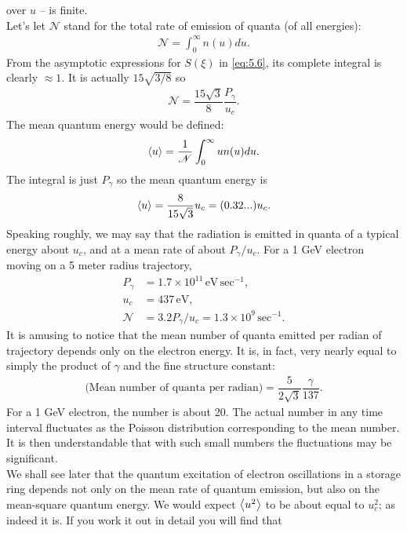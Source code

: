  over $u$ -- is finite.\\
Let's let $\mathscr{N}$ stand for the total rate of emission of quanta (of all energies):
\begin{align}
	\mathscr{N} = \int_0^\infty n(u) du.
\end{align}
From the asymptotic expressions for $S(\xi)$ in \eqref{eq:5.6}, its complete integral
 is clearly $\approx 1$. It is actually $15\sqrt{3/8}$ so
\begin{align} \label{eq:5.12}
	\mathscr{N} = \dfrac{15\sqrt{3}}{8} \dfrac{P_\gamma}{u_c}.
\end{align}
The mean quantum energy would be defined:
\begin{align}
	\left< u \right> = \dfrac{1}{\mathscr{N}} \int_0^\infty u n(u) du.
\end{align}
The integral is just $P_\gamma$ so the mean quantum energy is
\begin{align}
	\left< u \right> = \dfrac{8}{15\sqrt{3}} u_c = (0.32...) u_c.
\end{align}
Speaking roughly, we may say that the radiation is emitted in quanta of a typical energy about $u_c$, and at a mean rate of about $P_\gamma/u_c$. For a 1 GeV electron moving on a 5 meter radius trajectory,
\begin{align*}
	P_\gamma &= 1.7 \times 10^{11}\, \text{eV}\,\text{sec}^{-1},\\
    u_c &= 437\, \text{eV},\\
    \mathscr{N} &= 3.2 P_\gamma / u_c = 1.3 \times 10^9\, \text{sec}^{-1}.
\end{align*}
It is amusing to notice that the mean number of quanta emitted per radian of trajectory depends only on the electron energy. It is, in fact, very nearly equal to simply the product of $\gamma$ and the fine structure constant:
\begin{align}
	\text{(Mean number of quanta per radian)} = \dfrac{5}{2\sqrt{3}} \dfrac{\gamma}{137}.
\end{align}
For a 1 GeV electron, the number is about 20. The actual number in any time interval fluctuates
 as the Poisson distribution corresponding to the mean number. It is then understandable
 that with such small numbers the fluctuations may be significant.\\
 We shall see later that the quantum excitation of electron oscillations in a storage ring depends not only on the mean rate of quantum emission, but also on the mean-square quantum energy. We would expect $\left< u^2 \right>$ to be about equal to $u_c^2$; as indeed it is.
 If you work it out in detail you will find that

